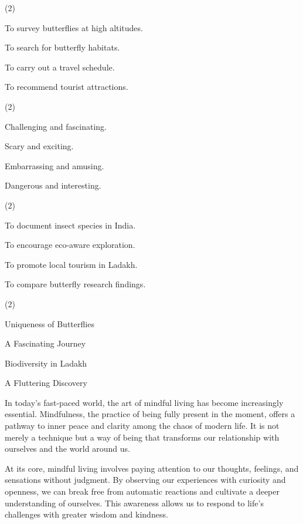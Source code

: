 \documentclass{英语试卷}
\begin{document}
\begin{choices}(2)
  \item To survey butterflies at high altitudes.
  \item To search for butterfly habitats.
  \item To carry out a travel schedule.
  \item To recommend tourist attractions.
\end{choices}
\begin{choices}(2)
  \item Challenging and fascinating.
  \item Scary and exciting.
  \item Embarrassing and amusing.
  \item Dangerous and interesting.
\end{choices}
\begin{choices}(2)
  \item To document insect species in India.
  \item To encourage eco-aware exploration.
  \item To promote local tourism in Ladakh.
  \item To compare butterfly research findings.
\end{choices}
\begin{choices}(2)
  \item Uniqueness of Butterflies
  \item A Fascinating Journey
  \item Biodiversity in Ladakh
  \item A Fluttering Discovery
\end{choices}
\par In today's fast-paced world, the art of mindful living has become increasingly essential. Mindfulness, the practice of being fully present in the moment, offers a pathway to inner peace and clarity among the chaos of modern life. It is not merely a technique but a way of being that transforms our relationship with ourselves and the world around us.\par
\par At its core, mindful living involves paying attention to our thoughts, feelings, and sensations without judgment. By observing our experiences with curiosity and openness, we can break free from automatic reactions and cultivate a deeper understanding of ourselves. This awareness allows us to respond to life's challenges with greater wisdom and kindness.\par
\end{document}
